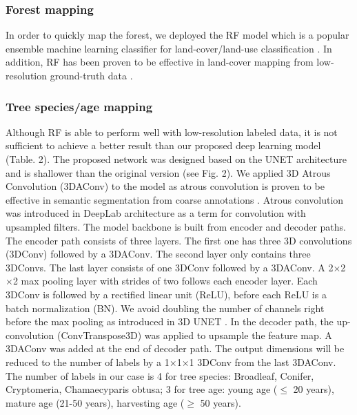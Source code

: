 \subsubsection*{Forest mapping}
In order to quickly map the forest, we deployed the RF model which is a popular ensemble machine learning classifier for land-cover/land-use classification \citep{gislason2006random}. In addition, RF has been proven to be effective in land-cover mapping from low-resolution ground-truth data \citep{robinson2021global}.\par
\subsubsection*{Tree species\slash age mapping}
Although RF is able to perform well with low-resolution labeled data, it is not sufficient to achieve a better result than our proposed deep learning model (Table. 2). The proposed network was designed based on the UNET architecture \citep{ronneberger2015u} and is shallower than the original version (see Fig. 2). We applied 3D Atrous Convolution (3DAConv) to the model as atrous convolution is proven to be effective in semantic segmentation from coarse annotations \citep{chen2017rethinking}. Atrous convolution was introduced in DeepLab architecture \citep{chen2017deeplab} as a term for convolution with upsampled filters. The model backbone is built from encoder and decoder paths. The encoder path consists of three layers. The first one has three 3D convolutions (3DConv) followed by a 3DAConv. The second layer only contains three 3DConvs. The last layer consists of one 3DConv followed by a 3DAConv. A 2$\times$2$\times$2 max pooling layer with strides of two follows each encoder layer. Each 3DConv is followed by a rectified linear unit (ReLU), before each ReLU is a batch normalization (BN). We avoid doubling the number of channels right before the max pooling as introduced in 3D UNET \citep{cciccek20163d}. In the decoder path, the up-convolution (ConvTranspose3D) was applied to upsample the feature map. A 3DAConv was added at the end of decoder path. The output dimensions will be reduced to the number of labels by a 1$\times$1$\times$1 3DConv from the last 3DAConv. The number of labels in our case is 4 for tree species: Broadleaf, Conifer, Cryptomeria, Chamaecyparis obtusa; 3 for tree age: young age ($\le$ 20 years), mature age (21-50 years), harvesting age ($\ge$ 50 years). \par
